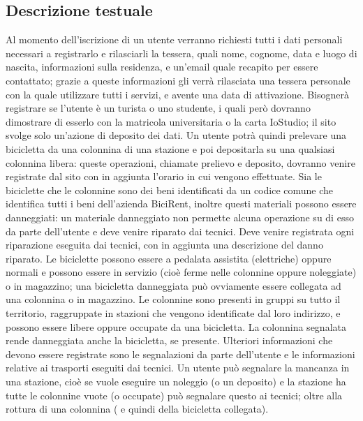 \documentclass[a4paper,twoside]{article}
\begin{document}
\subsection{Descrizione testuale}
Al momento dell'iscrizione di un utente verranno richiesti tutti i dati personali necessari a registrarlo e rilasciarli la tessera, quali nome, cognome, data e luogo di nascita, informazioni sulla residenza, e un'email quale recapito per essere contattato; grazie a queste informazioni gli verrà rilasciata una tessera personale con la quale utilizzare tutti i servizi, e avente una data di attivazione.\newline
Bisognerà registrare se l'utente è un turista o uno studente, i quali però dovranno dimostrare di esserlo con la matricola universitaria o la carta IoStudio; il sito svolge solo un'azione di deposito dei dati.\newline
Un utente potrà quindi prelevare una bicicletta da una colonnina di una stazione e poi depositarla su una qualsiasi colonnina libera: queste operazioni, chiamate prelievo e deposito, dovranno venire registrate dal sito con in aggiunta l'orario in cui vengono effettuate.\newline
Sia le biciclette che le colonnine sono dei beni identificati da un codice comune che identifica tutti i beni dell'azienda BiciRent, inoltre questi materiali possono essere danneggiati: un materiale danneggiato non permette alcuna operazione su di esso da parte dell'utente e deve venire riparato dai tecnici.\newline
Deve venire registrata ogni riparazione eseguita dai tecnici, con in aggiunta una descrizione del danno riparato.\newline
Le biciclette possono essere a pedalata assistita (elettriche) oppure normali e possono essere in servizio (cioè ferme nelle colonnine oppure noleggiate) o in magazzino; una bicicletta danneggiata può ovviamente essere collegata ad una colonnina o in magazzino.\newline
Le colonnine sono presenti in gruppi su tutto il territorio, raggruppate in stazioni che vengono identificate dal loro indirizzo, e possono essere libere oppure occupate da una bicicletta. La colonnina segnalata rende danneggiata anche la bicicletta, se presente.\newline
Ulteriori informazioni che devono essere registrate sono le segnalazioni da parte dell'utente e le informazioni relative ai trasporti eseguiti dai tecnici.\newline
Un utente può segnalare la mancanza in una stazione, cioè se vuole eseguire un noleggio (o un deposito) e la stazione ha tutte le colonnine vuote (o occupate) può segnalare questo ai tecnici; oltre alla  rottura di una colonnina ( e quindi della bicicletta collegata).\newline
\end{document}
